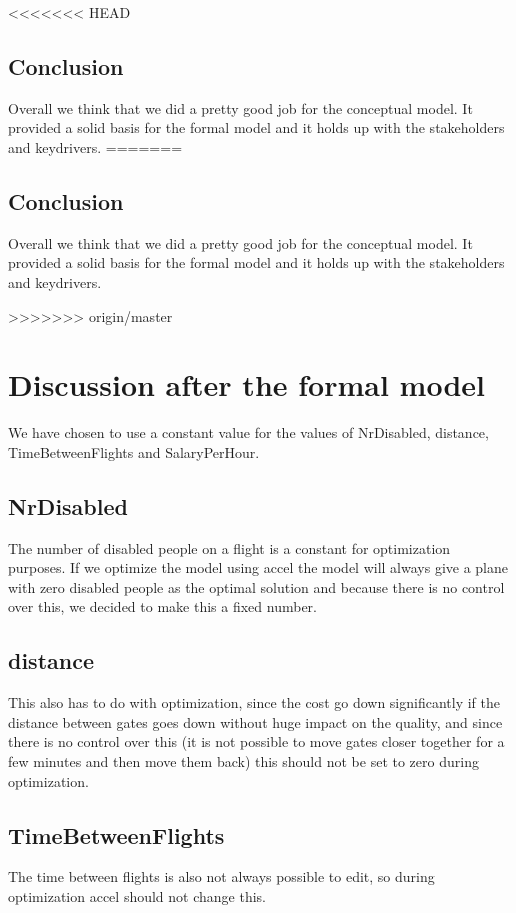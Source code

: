 \documentclass[a4paper, 11pt, notitlepage]{report}
\begin{document}
<<<<<<< HEAD
	\section{Conclusion} Overall we think that we did a pretty good job for the conceptual model. It provided a solid basis for the formal model and it holds up with the stakeholders and keydrivers.
=======
	\section{Conclusion} Overall we think that we did a pretty good job for the conceptual model. It provided a solid basis for the formal model and it holds up with the stakeholders and keydrivers.

>>>>>>> origin/master
\chapter{Discussion after the formal model}
We have chosen to use a constant value for the values of NrDisabled, distance, TimeBetweenFlights and SalaryPerHour.\\
	
	\section{NrDisabled}
The number of disabled people on a flight is a constant for optimization purposes. If we optimize the model using accel the  model will always give a plane with zero disabled people as the optimal solution and because there is no control over this, we decided to make this a fixed number.
	
	\section{distance}
This also has to do with optimization, since the cost go down significantly if the distance between gates goes down without huge impact on the quality, and since there is no control over this (it is not possible to move gates closer together for a few minutes and then move them back) this should not be set to zero during optimization.
	
	\section{TimeBetweenFlights}
The time between flights is also not always possible to edit, so during optimization accel should not change this.
	
\end{document}
